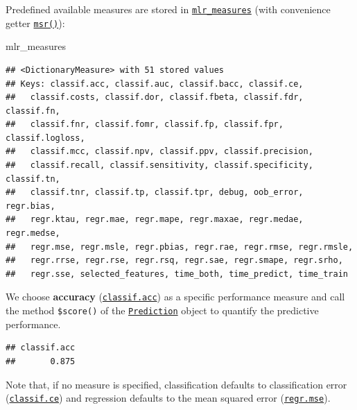 \documentclass[]{scrbook}
\newenvironment{Shaded}{\begin{snugshade}}{\end{snugshade}}
\newcommand{\KeywordTok}[1]{\textcolor[rgb]{0.13,0.29,0.53}{\textbf{#1}}}
\newcommand{\NormalTok}[1]{#1}
\newcommand{\OperatorTok}[1]{\textcolor[rgb]{0.81,0.36,0.00}{\textbf{#1}}}
\newcommand{\StringTok}[1]{\textcolor[rgb]{0.31,0.60,0.02}{#1}}
\renewenvironment{Shaded} {\begin{snugshade}\small} {\end{snugshade}}
\begin{document}
Predefined available measures are stored in \href{https://mlr3.mlr-org.com/reference/mlr_measures.html}{\texttt{mlr\_measures}} (with convenience getter \href{https://mlr3.mlr-org.com/reference/mlr_sugar.html}{\texttt{msr()}}):

\begin{Shaded}
\begin{Highlighting}[]
\NormalTok{mlr_measures}
\end{Highlighting}
\end{Shaded}

\begin{verbatim}
## <DictionaryMeasure> with 51 stored values
## Keys: classif.acc, classif.auc, classif.bacc, classif.ce,
##   classif.costs, classif.dor, classif.fbeta, classif.fdr, classif.fn,
##   classif.fnr, classif.fomr, classif.fp, classif.fpr, classif.logloss,
##   classif.mcc, classif.npv, classif.ppv, classif.precision,
##   classif.recall, classif.sensitivity, classif.specificity, classif.tn,
##   classif.tnr, classif.tp, classif.tpr, debug, oob_error, regr.bias,
##   regr.ktau, regr.mae, regr.mape, regr.maxae, regr.medae, regr.medse,
##   regr.mse, regr.msle, regr.pbias, regr.rae, regr.rmse, regr.rmsle,
##   regr.rrse, regr.rse, regr.rsq, regr.sae, regr.smape, regr.srho,
##   regr.sse, selected_features, time_both, time_predict, time_train
\end{verbatim}

We choose \textbf{accuracy} (\href{https://mlr3.mlr-org.com/reference/mlr_measures_classif.acc.html}{\texttt{classif.acc}}) as a specific performance measure and call the method \texttt{\$score()} of the \href{https://mlr3.mlr-org.com/reference/Prediction.html}{\texttt{Prediction}} object to quantify the predictive performance.

\begin{Shaded}
\end{Shaded}

\begin{verbatim}
## classif.acc 
##       0.875
\end{verbatim}

Note that, if no measure is specified, classification defaults to classification error (\href{https://mlr3.mlr-org.com/reference/mlr_measures_classif.ce.html}{\texttt{classif.ce}}) and regression defaults to the mean squared error (\href{https://mlr3.mlr-org.com/reference/mlr_measures_regr.mse.html}{\texttt{regr.mse}}).
\end{document}
